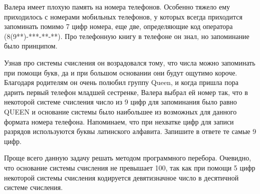
Валера имеет плохую память на номера телефонов. Особенно тяжело ему приходилось с номерами мобильных телефонов, у которых всегда приходится запоминать помимо 7 цифр номера, еще две, определяющие код оператора (8(9**)-***-**-**). Про телефонную книгу в телефоне он знал, но запоминание было принципом.

Узнав про системы счисления он возрадовался тому, что числа можно запоминать при помощи букв, да и при большом основании они будут ощутимо короче. Благодаря родителям он очень полюбил группу Queen, и когда пришла пора дарить первый телефон младшей сестренке, Валера выбрал ей номер так, что в некоторой системе счисления число из 9 цифр для запоминания было равно QUEEN и основание системы было наибольшее из возможных для данного формата номера телефона. Напоминаем, что при нехватке цифр для записи разрядов используются буквы латинского алфавита. Запишите в ответе те самые 9 цифр.

\solutionSection
Проще всего данную задачу решать методом программного перебора. Очевидно, что основание системы счисления не превышает 100, так как при помощи 5 цифр некоторой системы счисления кодируется девятизначное число в десятичной системе счисления.



